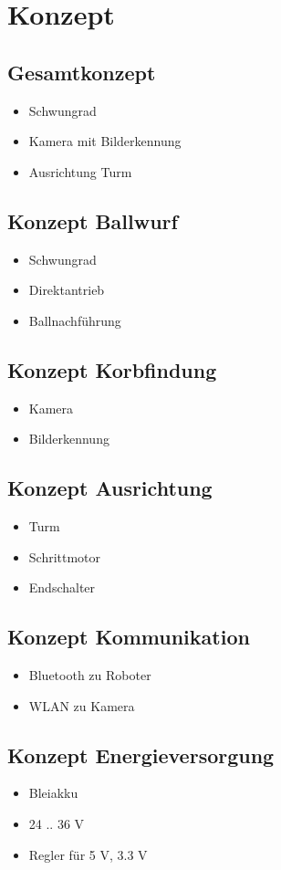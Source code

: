 \section{Konzept}

\subsection{Gesamtkonzept}
\begin{itemize}
    \item Schwungrad
    \item Kamera mit Bilderkennung
    \item Ausrichtung Turm
\end{itemize}

\subsection{Konzept Ballwurf}
\begin{itemize}
    \item Schwungrad
    \item Direktantrieb
    \item Ballnachführung
\end{itemize}

\subsection{Konzept Korbfindung}
\begin{itemize}
    \item Kamera
    \item Bilderkennung
\end{itemize}

\subsection{Konzept Ausrichtung}
\begin{itemize}
    \item Turm
    \item Schrittmotor
    \item Endschalter
\end{itemize}

\subsection{Konzept Kommunikation}
\begin{itemize}
    \item Bluetooth zu Roboter
    \item WLAN zu Kamera
\end{itemize}

\subsection{Konzept Energieversorgung}
\begin{itemize}
    \item Bleiakku
    \item 24 .. 36 V
    \item Regler für 5 V, 3.3 V
\end{itemize}

